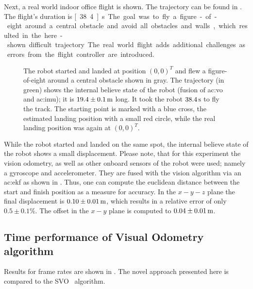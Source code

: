 Next, a real world indoor office flight is shown.
The trajectory can be found in .
The flight's duration is \unit[38.4]{s}.
The goal was to fly a figure-of-eight around a central obstacle and avoid all obstacles and walls, which resulted in the here-shown difficult trajectory.
The real world flight adds additional challenges as errors from the flight controller are introduced.

\begin{figure}[]
  \centering
   
   \caption{The robot started and landed at position $(0,0)^T$ and flew a figure-of-eight around a central obstacle shown in gray. The trajectory (in green) shows the internal believe state of the robot (fusion of \gls{ac:vo} and \gls{ac:imu}); it is $\unit[19.4 \pm 0.1]{m}$ long. It took the robot $\unit[38.4]{s}$ to fly the track. The starting point is marked with a blue cross, the estimated landing position with a small red circle, while the real landing position was again at $(0,0)^T$.}
  \label{fig:robot_experiments_indoorflight_office}
\end{figure}

While the robot started and landed on the same spot, the internal believe state of the robot shows a small displacement.
Please note, that for this experiment the vision odometry, as well as other onboard sensors of the robot were used; namely a gyroscope and accelerometer.
They are fused with the vision algorithm via an \gls{ac:ekf} as shown in .
Thus, one can compute the euclidean distance between the start and finish position as a measure for accuracy.
In the $x-y-z$ plane the final displacement is $\unit[0.10 \pm 0.01]{m}$, which results in a relative error of only $0.5 \pm 0.1$\%.
The offset in the $x-y$ plane is computed to $\unit[0.04\pm 0.01]{m}$.





\subsection{Time performance of Visual Odometry algorithm}
\label{ssec:perception_results_timeperformanceofvisualodometryalgorithm}

Results for frame rates are shown in .
The novel approach presented here is compared  to the SVO~\cite{forster2014svo} algorithm.

